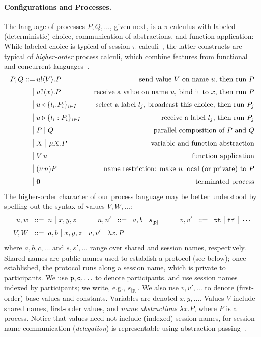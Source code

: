 \documentclass[runningheads,plain]{llncs}
\begin{document}
\paragraph{Configurations and Processes.}
The language  of processes  $P, Q, \ldots$, given next, is a $\pi$-calculus with   labeled (deterministic) choice, communication of abstractions, and function application:
While labeled choice is typical of session $\pi$-calculi~\cite{DBLP:conf/esop/HondaVK98}, the latter constructs are typical of \emph{higher-order} process calculi, which combine features from functional and concurrent  languages~\cite{DBLP:journals/tcs/Sangiorgi01}. 
\begin{align*}
P, Q ::= \, 
        & u ! \langle V \rangle .{P} \,\,\, \, \, &\text{send value $V$ on name $u$, then run $P$} \\
\;\mbox{\large{$\mid$}}\; & u ? (x) .{P} \,\,\, \, \, & \text{receive a value on name $u$, bind it to $x$, then run $P$} \\
\;\mbox{\large{$\mid$}}\; &  u \triangleleft \{l_i. P_i\}_{i\in I}\,\,\, \, \, & \text{select a label $l_j$, broadcast this choice, then run $P_j$} \\
\;\mbox{\large{$\mid$}}\; & u \triangleright \{l_i:P_i\}_{i \in I} \,\,\, \, \, & \text{receive a label  $l_j$, then run  $P_j$} \\
\;\mbox{\large{$\mid$}}\;   & P \;|\; Q  &\text{parallel composition of $P$ and $Q$} \\
\;\mbox{\large{$\mid$}}\;  & X \;\mbox{\large{$\mid$}}\;  \mu X. P \,\,\, &\text{variable and function abstraction}\\
\;\mbox{\large{$\mid$}}\; & V\, {u} \,\,\, &\text{function application} \\
\;\mbox{\large{$\mid$}}\;  & (\nu\, n)P \,\,\, &\text{name restriction: make $n$ local (or private) to $P$} \\
\;\mbox{\large{$\mid$}}\;  & \mathbf{0} \,\,\, &\text{terminated process}
\end{align*}
The higher-order character of our process language may be better understood by spelling out the syntax of values $V, W, \ldots$:
\begin{align*}
u,w  \;\;::=\;\;& n \;\mbox{\large{$\mid$}}\; x,y,z
\qquad \quad
n,n' \;\;::=\;\; a,b \;\mbox{\large{$\mid$}}\; s_{[\mathtt{p}]}
\qquad \quad
 {v},  {v}'  \;\;::=\;\;   \mathtt{tt} \;\mbox{\large{$\mid$}}\; \mathtt{ff} \;\mbox{\large{$\mid$}}\; \cdots
\\
V,W \;\;::=\;\; & {a,b} \;\mbox{\large{$\mid$}}\;  x,y,z \;\mbox{\large{$\mid$}}\;  v, v' \;\mbox{\large{$\mid$}}\; {\lambda x.\,P}
\end{align*}
\noindent 
where  $a,b,c,\ldots$ and $s,s',\ldots$ range over shared and session names, respectively.
Shared names are public names used to establish a protocol (see below); once established, the protocol runs along a session name, which is private to participants.
We   use $\mathtt{p}, \mathtt{q}, \ldots$ to denote  participants, and 
use session names indexed by participants;  we write, e.g., $s_{[\mathtt{p}]}$.
We also use $v,v',\ldots$ to denote
   (first-order) base values and constants. Variables are denoted  $x,y, \ldots$. 
Values $V$ include shared names, 
first-order values, and \emph{name abstractions} $\lambda x. P$, where $P$ is a process.
Notice that values need not include (indexed) session names, for session name communication (\emph{delegation}) is  representable using abstraction passing~\cite{KPY2016}.
\end{document}
